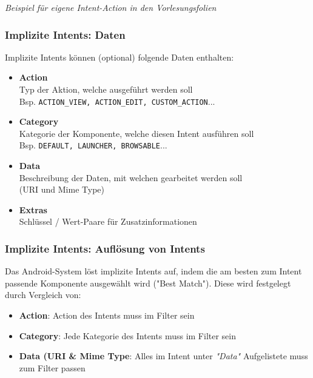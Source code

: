 \documentclass[a4paper]{article}
\begin{document}
	\textit{Beispiel für eigene Intent-Action in den Vorlesungsfolien}

		\subsubsection{Implizite Intents: Daten}
		
		Implizite Intents können (optional) folgende Daten enthalten:
		
		\begin{itemize}
			
			\item \textbf{Action}\\
					Typ der Aktion, welche ausgeführt werden soll\\
					Bsp. \texttt{ACTION\_VIEW, ACTION\_EDIT, CUSTOM\_ACTION}...
					
			\item \textbf{Category}\\
			Kategorie der Komponente, welche diesen Intent ausführen soll\\
			Bsp. \texttt{DEFAULT, LAUNCHER, BROWSABLE}...
			
			\item \textbf{Data}\\
			Beschreibung der Daten, mit welchen gearbeitet werden soll\\
			(URI und Mime Type)
			
			\item \textbf{Extras}\\
			Schlüssel / Wert-Paare für Zusatzinformationen
			
		\end{itemize}
		
		\newpage
		
		\subsubsection{Implizite Intents: Auflösung von Intents}
		
		Das Android-System löst implizite Intents auf, indem die am besten zum Intent passende Komponente ausgewählt wird ("Best Match"). Diese wird festgelegt durch Vergleich von:
			
		\begin{itemize}
			
			\item \textbf{Action}: Action des Intents muss im Filter sein
			
			\item \textbf{Category}: Jede Kategorie des Intents muss im Filter sein
			
			\item \textbf{Data (URI \& Mime Type}: Alles im Intent unter \textit{"Data"} Aufgelistete muss zum Filter passen
			
		\end{itemize}
		
\end{document}
